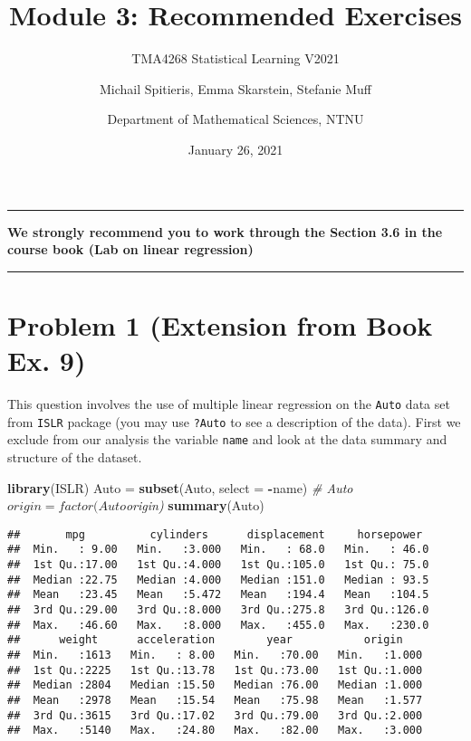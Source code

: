 \documentclass[]{article}
\title{Module 3: Recommended Exercises}
\subtitle{TMA4268 Statistical Learning V2021}
\author{Michail Spitieris, Emma Skarstein, Stefanie Muff \and Department of Mathematical Sciences, NTNU}
\date{January 26, 2021}
\newenvironment{Shaded}{\begin{snugshade}}{\end{snugshade}}
\newcommand{\CommentTok}[1]{\textcolor[rgb]{0.56,0.35,0.01}{\textit{#1}}}
\newcommand{\DataTypeTok}[1]{\textcolor[rgb]{0.13,0.29,0.53}{#1}}
\newcommand{\KeywordTok}[1]{\textcolor[rgb]{0.13,0.29,0.53}{\textbf{#1}}}
\newcommand{\NormalTok}[1]{#1}
\newcommand{\OperatorTok}[1]{\textcolor[rgb]{0.81,0.36,0.00}{\textbf{#1}}}
\newcommand{\StringTok}[1]{\textcolor[rgb]{0.31,0.60,0.02}{#1}}
\begin{document}
\maketitle

\begin{center}\rule{0.5\linewidth}{0.5pt}\end{center}

\textbf{We strongly recommend you to work through the Section 3.6 in the
course book (Lab on linear regression)}

\begin{center}\rule{0.5\linewidth}{0.5pt}\end{center}

\hypertarget{problem-1-extension-from-book-ex.-9}{%
\section{Problem 1 (Extension from Book Ex.
9)}\label{problem-1-extension-from-book-ex.-9}}

This question involves the use of multiple linear regression on the
\texttt{Auto} data set from \texttt{ISLR} package (you may use
\texttt{?Auto} to see a description of the data). First we exclude from
our analysis the variable \texttt{name} and look at the data summary and
structure of the dataset.

\begin{Shaded}
\begin{Highlighting}[]
\KeywordTok{library}\NormalTok{(ISLR)}
\NormalTok{Auto =}\StringTok{ }\KeywordTok{subset}\NormalTok{(Auto, }\DataTypeTok{select =} \OperatorTok{-}\NormalTok{name)}
\CommentTok{# Auto$origin = factor(Auto$origin)}
\KeywordTok{summary}\NormalTok{(Auto)}
\end{Highlighting}
\end{Shaded}

\begin{verbatim}
##       mpg          cylinders      displacement     horsepower   
##  Min.   : 9.00   Min.   :3.000   Min.   : 68.0   Min.   : 46.0  
##  1st Qu.:17.00   1st Qu.:4.000   1st Qu.:105.0   1st Qu.: 75.0  
##  Median :22.75   Median :4.000   Median :151.0   Median : 93.5  
##  Mean   :23.45   Mean   :5.472   Mean   :194.4   Mean   :104.5  
##  3rd Qu.:29.00   3rd Qu.:8.000   3rd Qu.:275.8   3rd Qu.:126.0  
##  Max.   :46.60   Max.   :8.000   Max.   :455.0   Max.   :230.0  
##      weight      acceleration        year           origin     
##  Min.   :1613   Min.   : 8.00   Min.   :70.00   Min.   :1.000  
##  1st Qu.:2225   1st Qu.:13.78   1st Qu.:73.00   1st Qu.:1.000  
##  Median :2804   Median :15.50   Median :76.00   Median :1.000  
##  Mean   :2978   Mean   :15.54   Mean   :75.98   Mean   :1.577  
##  3rd Qu.:3615   3rd Qu.:17.02   3rd Qu.:79.00   3rd Qu.:2.000  
##  Max.   :5140   Max.   :24.80   Max.   :82.00   Max.   :3.000
\end{verbatim}
\end{document}
